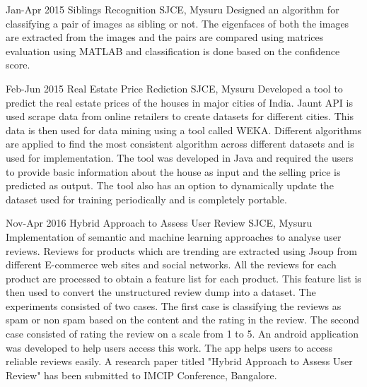 \documentclass[]{friggeri-cv} %
\begin{document}
\begin{entrylist}


\entry
{Jan-Apr 2015}
{Siblings Recognition}
{SJCE, Mysuru}
{Designed an algorithm for classifying a pair of images as sibling or not. The eigenfaces of both the images are extracted from the images and the pairs are compared using matrices evaluation using MATLAB and classification is done based on the confidence score.
\newline}


\entry
{Feb-Jun 2015}
{Real Estate Price Rediction}
{SJCE, Mysuru}
{Developed a tool to predict the real estate prices of the houses in major cities of India. Jaunt API is used scrape data from online retailers to create datasets for different cities. This data is then used for data mining using a tool called WEKA. Different algorithms are applied to find the most consistent algorithm across different datasets and is used for implementation. The tool was developed in Java and required the users to provide basic information about the house as input and the selling price is predicted as output. The tool also has an option to dynamically update the dataset used for training periodically and is completely portable.
\newline}


\entry
{Nov-Apr 2016}
{Hybrid Approach to Assess User Review}
{SJCE, Mysuru}
{
Implementation of semantic and machine learning approaches to analyse user reviews. Reviews for products which are trending are extracted using Jsoup from different E-commerce web sites and social networks. All the reviews for each product are processed to obtain a feature list for each product. This feature list is then used to convert the unstructured review dump into a dataset. The experiments consisted of two cases. The first case is classifying the reviews as spam or non spam based on the content and the rating in the review. The second case consisted of rating the review on a scale from 1 to 5. An android application was developed to help users access this work. The app helps users to access reliable reviews easily. A research paper titled "Hybrid Approach to Assess User Review" has been submitted to IMCIP Conference, Bangalore.
\newline}


\end{entrylist}
\end{document}
